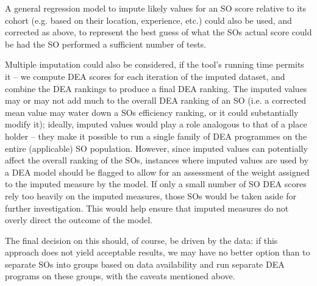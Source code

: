 A general regression model to impute likely values for an SO score relative to its cohort (e.g. based on their location, experience, etc.) could also be used, and corrected as above, to represent the best guess of what the SOs actual score could be had the SO performed a sufficient number of tests.  
\par Multiple imputation could also be considered, if the tool's running time permits it -- we compute DEA scores for each iteration of the imputed dataset, and combine the DEA rankings to produce a final DEA ranking. The imputed values may or may not add much to the overall DEA ranking of an SO (i.e. a corrected mean value may water down a SOs efficiency ranking, or it could substantially modify it); ideally, imputed values would play a role analogous to that of a place holder -- they make it possible to run a single family of DEA programmes on the entire (applicable) SO population. However, since imputed values can potentially affect the overall ranking of the SOs, instances where imputed values are used by a DEA model should be flagged to allow for an assessment of the weight assigned to the imputed measure by the model.  If only a small number of SO DEA scores rely too heavily on the imputed measures, those SOs would be taken aside for further investigation. This would help ensure that imputed measures do not overly direct the outcome of the model. \par The final decision on this should, of course, be driven by the data: if this approach does not yield acceptable results, we may have no better option than to separate SOs into groups based on data availability and run separate DEA programs on these groups, with the caveats mentioned above.
